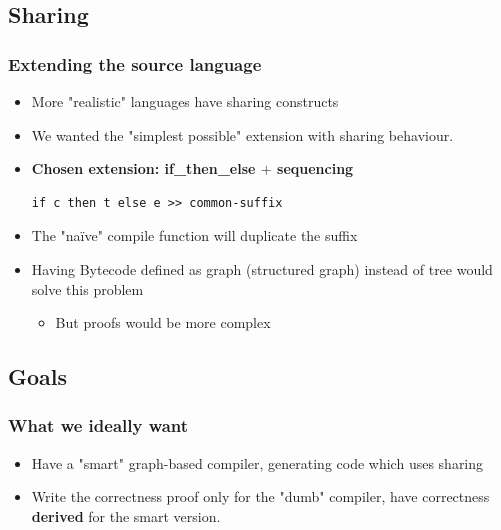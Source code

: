     \subsection{Sharing}
        \begin{frame}[fragile]
            \frametitle{Extending the source language}

            \begin{itemize}
                \item More "realistic" languages have sharing constructs
                \item We wanted the "simplest possible" extension with sharing behaviour.
                \item \textbf{Chosen extension: if\_then\_else $+$ sequencing}
                    \begin{verbatim}
if c then t else e >> common-suffix
                    \end{verbatim}
            \end{itemize}

            \begin{itemize}
                \item The "naïve" compile function will duplicate the suffix
                \item Having Bytecode defined as graph (structured graph) instead of tree
                    would solve this problem
                    \begin{itemize}
                        \item But proofs would be more complex
                    \end{itemize}
            \end{itemize}
\end{frame}


    \subsection{Goals}
        \begin{frame}
            \frametitle{What we ideally want}

            \begin{itemize}
                \item Have a "smart" graph-based compiler, generating code which uses sharing
                \item Write the correctness proof only for the "dumb" compiler,
                    have correctness \textbf{derived} for the smart version.
              \end{itemize}
        \end{frame}

